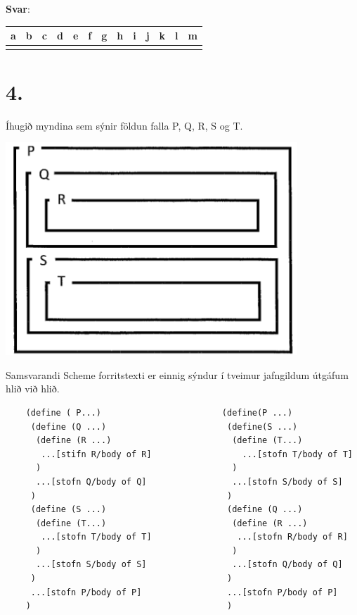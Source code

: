 \documentclass{article}
\begin{document}
    \textbf{Svar}:

    \begin{tabularx}{\textwidth}{ |X|X|X|X|X|X|X|X|X|X|X|X|X|}
        \hline
        \textbf{a}  & \textbf{b}  & \textbf{c}  & \textbf{d}  & \textbf{e}  & \textbf{f}  & \textbf{g}  & \textbf{h}  & \textbf{i}  & \textbf{j}  & \textbf{k}  & \textbf{l} & \textbf{m}   \\ \hline
         & & & & & & & & & & & & \\ \hline
     \end{tabularx}

     \newpage

     \section{4.}
     Íhugið myndina sem sýnir földun falla P, Q, R, S og T.

     \begin{center}
        \includegraphics[scale = 1]{myndir/foldun.png}
     \end{center}

     Samsvarandi Scheme forritstexti er einnig sýndur í tveimur jafngildum útgáfum 
     hlið við hlið. 

     \begin{verbatim}
    (define ( P...)                        (define(P ...)
     (define (Q ...)                        (define(S ...)
      (define (R ...)                        (define (T...)
       ...[stifn R/body of R]                  ...[stofn T/body of T]
      )                                      )
      ...[stofn Q/body of Q]                 ...[stofn S/body of S]
     )                                      )
     (define (S ...)                        (define (Q ...)
      (define (T...)                         (define (R ...)
       ...[stofn T/body of T]                 ...[stofn R/body of R]
      )                                      )
      ...[stofn S/body of S]                 ...[stofn Q/body of Q]
     )                                      )
     ...[stofn P/body of P]                 ...[stofn P/body of P]
    )                                       )
     \end{verbatim}
    
\end{document}
